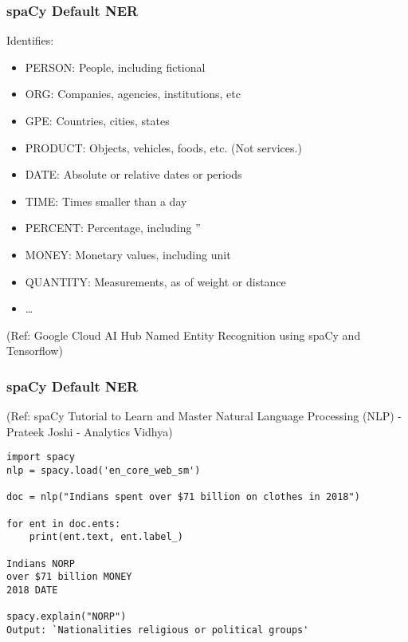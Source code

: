 \begin{frame}[fragile]\frametitle{spaCy Default NER}
Identifies:
  \begin{itemize}
  \item PERSON:	People, including fictional
	\item ORG:	Companies, agencies, institutions, etc
	\item GPE:	Countries, cities, states
	\item PRODUCT:	Objects, vehicles, foods, etc. (Not services.)
	\item DATE:	Absolute or relative dates or periods
	\item TIME:	Times smaller than a day
	\item PERCENT:	Percentage, including ”%
	\item MONEY:	Monetary values, including unit
	\item QUANTITY:	Measurements, as of weight or distance
	\item \ldots
  \end{itemize}
	
	{\tiny (Ref: Google Cloud AI Hub Named Entity Recognition using spaCy and Tensorflow)}
\end{frame}

\begin{frame}[fragile]\frametitle{spaCy Default NER}

	{\tiny (Ref: spaCy Tutorial to Learn and Master Natural Language Processing (NLP) - Prateek Joshi - Analytics Vidhya)}

\begin{lstlisting}
import spacy
nlp = spacy.load('en_core_web_sm')

doc = nlp("Indians spent over $71 billion on clothes in 2018")
 
for ent in doc.ents:
    print(ent.text, ent.label_)
		
Indians NORP
over $71 billion MONEY
2018 DATE

spacy.explain("NORP")
Output: `Nationalities religious or political groups'
\end{lstlisting}
	
\end{frame}


